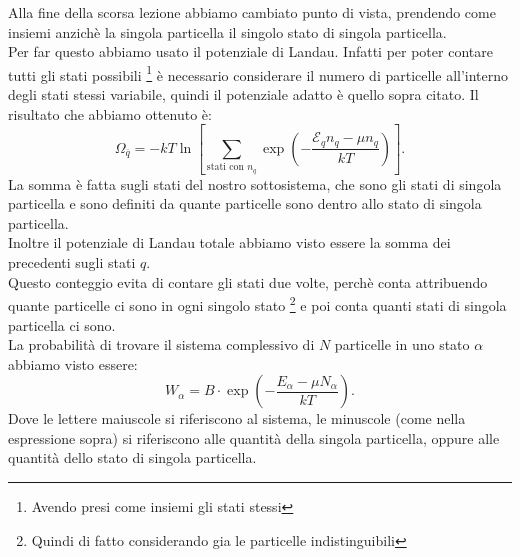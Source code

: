 Alla fine della scorsa lezione abbiamo cambiato punto di vista, prendendo come insiemi anzichè la singola particella il singolo stato di singola particella. \\
Per far questo abbiamo usato il potenziale di Landau. Infatti per poter contare tutti gli stati possibili \footnote{Avendo presi come insiemi gli stati stessi} è necessario considerare il numero di particelle all'interno degli stati stessi variabile, quindi il potenziale adatto è quello sopra citato. Il risultato che abbiamo ottenuto è:
\[
	\Omega_{\overline{q}} = - kT \ln \left[ \sum_{\text{stati con $n_{q}$}}^{} \exp\left( -\frac{\mathcal{E}_{q}n_{q}-\mu n_{q}}{kT} \right)\right] 
.\] \label{eq:potenziale-Landau1}
La somma è fatta sugli stati del nostro sottosistema, che sono gli stati di singola particella e sono definiti da quante particelle sono dentro allo stato di singola particella.\\
Inoltre il potenziale di Landau totale abbiamo visto essere la somma dei precedenti sugli stati $q$.\\
Questo conteggio evita di contare gli stati due volte, perchè conta attribuendo quante particelle ci sono in ogni singolo stato \footnote{Quindi di fatto considerando gia le particelle indistinguibili} e poi conta quanti stati di singola particella ci sono.\\
La probabilità di trovare il sistema complessivo di $N$ particelle in uno stato $\alpha$ abbiamo visto essere:
\[
	W_\alpha= B\cdot \exp\left( -\frac{E_{\alpha}-\mu N_{\alpha}}{kT} \right)  
.\] 
Dove le lettere maiuscole si riferiscono al sistema, le minuscole (come nella espressione sopra) si riferiscono alle quantità della singola particella, oppure alle quantità dello stato di singola particella.\\
